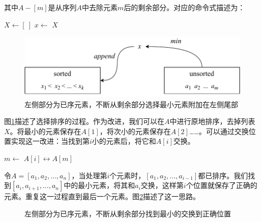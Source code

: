 \documentclass[b5paper]{ctexart}
\begin{document}
其中$A - [m]$是从序列$A$中去除元素$m$后的剩余部分。对应的命令式描述为：

\begin{algorithmic}[1]
  \State $X \gets [\ ]$
    \State $x \gets$ 
    \State {}
    \State {}
  \EndWhile
  \State \Return $X$
\EndFunction
\end{algorithmic}

\begin{figure}[htbp]
  \centering
  \includegraphics[scale=0.8]{img/ssort}
  \caption{左侧部分为已序元素，不断从剩余部分选择最小元素附加在左侧尾部}
  \label{fig:sel-sort}
\end{figure}

图\ref{fig:sel-sort}描述了选择排序的过程。作为改进，我们可以在$A$中进行原地排序，去掉列表$X$。将最小的元素保存在$A[1]$，将次小的元素保存在$A[2]$……。可以通过交换位置实现这一改进：当找到第$i$小的元素后，将它和$A[i]$交换。

\begin{algorithmic}[1]
    \State $m \gets$ 
    \State {} $A[i] \leftrightarrow A[m]$
  \EndFor
\EndFunction
\end{algorithmic}

令$A = [a_1, a_2, ..., a_n]$，当处理第$i$个元素时，$[a_1, a_2, ..., a_{i-1}]$都已排序。我们找到$[a_i, a_{i+1}, ..., a_n]$中的最小元素，将其和$a_i$交换，这样第$i$个位置就保存了正确的元素。重复这一过程直到最后一个元素。图\ref{fig:in-place-ssort}描述了这一思路。

\begin{figure}[htbp]
  \centering
  \caption{左侧部分为已序元素，不断从剩余部分找到最小的交换到正确位置}
  \label{fig:in-place-ssort}
\end{figure}
\end{document}
